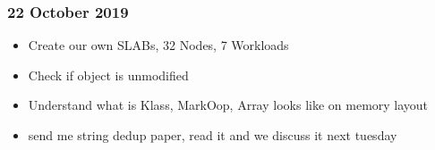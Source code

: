 \subsubsection{22 October 2019}

\begin{itemize}
\item Create our own SLABs, 32 Nodes, 7 Workloads
\item Check if object is unmodified
\item Understand what is Klass, MarkOop, Array looks like on memory layout
\item send me string dedup paper, read it and we discuss it next tuesday
\end{itemize}
